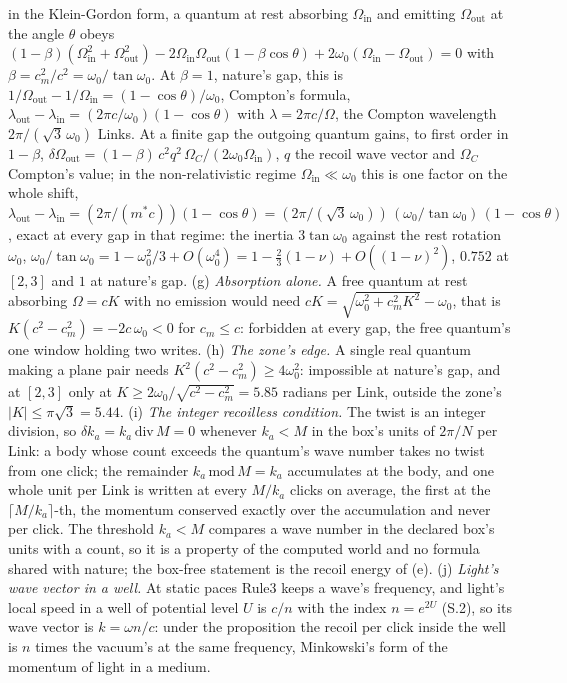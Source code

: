\begin{derivation}
in the Klein-Gordon form, a quantum at rest absorbing $\Omega_{\mathrm{in}}$ and emitting $\Omega_{\mathrm{out}}$ at the angle $\theta$ obeys $(1 - \beta)(\Omega_{\mathrm{in}}^2 + \Omega_{\mathrm{out}}^2) - 2\Omega_{\mathrm{in}}\Omega_{\mathrm{out}}(1 - \beta\cos\theta) + 2\omega_0(\Omega_{\mathrm{in}} - \Omega_{\mathrm{out}}) = 0$ with $\beta = c_m^2 / c^2 = \omega_0 / \tan\omega_0$. At $\beta = 1$, nature's gap, this is $1 / \Omega_{\mathrm{out}} - 1 / \Omega_{\mathrm{in}} = (1 - \cos\theta) / \omega_0$, Compton's formula, $\lambda_{\mathrm{out}} - \lambda_{\mathrm{in}} = (2\pi c / \omega_0)(1 - \cos\theta)$ with $\lambda = 2\pi c / \Omega$, the Compton wavelength $2\pi / (\sqrt 3\,\omega_0)$ Links. At a finite gap the outgoing quantum gains, to first order in $1 - \beta$, $\delta\Omega_{\mathrm{out}} = (1 - \beta)\,c^2 q^2\,\Omega_C / (2\omega_0\Omega_{\mathrm{in}})$, $q$ the recoil wave vector and $\Omega_C$ Compton's value; in the non-relativistic regime $\Omega_{\mathrm{in}} \ll \omega_0$ this is one factor on the whole shift, $\lambda_{\mathrm{out}} - \lambda_{\mathrm{in}} = (2\pi / (m^* c))(1 - \cos\theta) = (2\pi / (\sqrt 3\,\omega_0))\,(\omega_0 / \tan\omega_0)\,(1 - \cos\theta)$, exact at every gap in that regime: the inertia $3\tan\omega_0$ against the rest rotation $\omega_0$, $\omega_0 / \tan\omega_0 = 1 - \omega_0^2 / 3 + O(\omega_0^4) = 1 - \tfrac23(1 - \nu) + O((1 - \nu)^2)$, $0.752$ at $[2, 3]$ and $1$ at nature's gap. (g) \emph{Absorption alone.} A free quantum at rest absorbing $\Omega = cK$ with no emission would need $cK = \sqrt{\omega_0^2 + c_m^2 K^2} - \omega_0$, that is $K(c^2 - c_m^2) = -2c\,\omega_0 < 0$ for $c_m \le c$: forbidden at every gap, the free quantum's one window holding two writes. (h) \emph{The zone's edge.} A single real quantum making a plane pair needs $K^2(c^2 - c_m^2) \ge 4\omega_0^2$: impossible at nature's gap, and at $[2, 3]$ only at $K \ge 2\omega_0 / \sqrt{c^2 - c_m^2} = 5.85$ radians per Link, outside the zone's $|K| \le \pi\sqrt 3 = 5.44$.
(i) \emph{The integer recoilless condition.} The twist is an integer division, so $\delta k_a = k_a\,\mathrm{div}\,M = 0$ whenever $k_a < M$ in the box's units of $2\pi / N$ per Link: a body whose count exceeds the quantum's wave number takes no twist from one click; the remainder $k_a\,\mathrm{mod}\,M = k_a$ accumulates at the body, and one whole unit per Link is written at every $M / k_a$ clicks on average, the first at the $\lceil M / k_a\rceil$-th, the momentum conserved exactly over the accumulation and never per click. The threshold $k_a < M$ compares a wave number in the declared box's units with a count, so it is a property of the computed world and no formula shared with nature; the box-free statement is the recoil energy of (e). (j) \emph{Light's wave vector in a well.} At static paces Rule3 keeps a wave's frequency, and light's local speed in a well of potential level $U$ is $c / n$ with the index $n = e^{2U}$ (S.2), so its wave vector is $k = \omega n / c$: under the proposition the recoil per click inside the well is $n$ times the vacuum's at the same frequency, Minkowski's form of the momentum of light in a medium.

\end{derivation}
